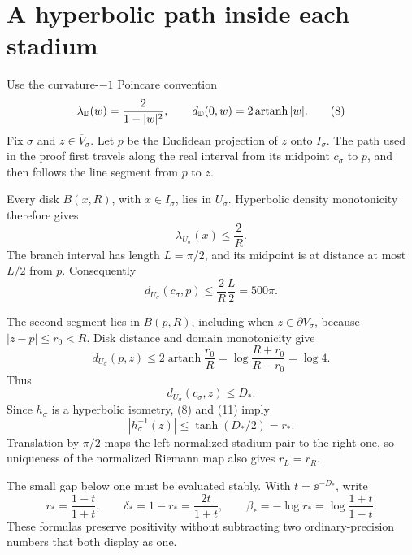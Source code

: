 \section{A hyperbolic path inside each stadium}

Use the curvature-\(-1\) Poincare convention
\[
 \lambda_{\mathbb D}(w)=\frac{2}{1-|w|^2},
 \qquad
 d_{\mathbb D}(0,w)=2\operatorname{artanh}|w|.
 \tag{8}
\]
Fix \(\sigma\) and \(z\in\overline V_\sigma\).  Let \(p\) be the Euclidean
projection of \(z\) onto \(I_\sigma\).  The path used in the proof first
travels along the real interval from its midpoint \(c_\sigma\) to \(p\), and
then follows the line segment from \(p\) to \(z\).

Every disk \(B(x,R)\), with \(x\in I_\sigma\), lies in \(U_\sigma\).
Hyperbolic density monotonicity therefore gives
\[
 \lambda_{U_\sigma}(x)\le \frac2R.
\]
The branch interval has length \(L=\pi/2\), and its midpoint is at distance
at most \(L/2\) from \(p\).  Consequently
\[
 d_{U_\sigma}(c_\sigma,p)
 \le \frac2R\frac L2
 =500\pi.
 \tag{9}
\]

The second segment lies in \(B(p,R)\), including when
\(z\in\partial V_\sigma\), because \(|z-p|\le r_0<R\).  Disk distance and
domain monotonicity give
\[
 d_{U_\sigma}(p,z)
 \le 2\operatorname{artanh}\frac{r_0}{R}
 =\log\frac{R+r_0}{R-r_0}
 =\log4.
 \tag{10}
\]
Thus
\[
 d_{U_\sigma}(c_\sigma,z)\le D_*.
 \tag{11}
\]
Since \(h_\sigma\) is a hyperbolic isometry, (8) and (11) imply
\[
 |h_\sigma^{-1}(z)|\le\tanh(D_*/2)=r_*.
\]
Translation by \(\pi/2\) maps the left normalized stadium pair to the right
one, so uniqueness of the normalized Riemann map also gives \(r_L=r_R\).

The small gap below one must be evaluated stably.  With \(t=\ee^{-D_*}\),
write
\[
 r_*=\frac{1-t}{1+t},
 \qquad
 \delta_*=1-r_*=\frac{2t}{1+t},
 \qquad
 \beta_*=-\log r_*=\log\frac{1+t}{1-t}.
 \tag{12}
\]
These formulas preserve positivity without subtracting two ordinary-precision
numbers that both display as one.

